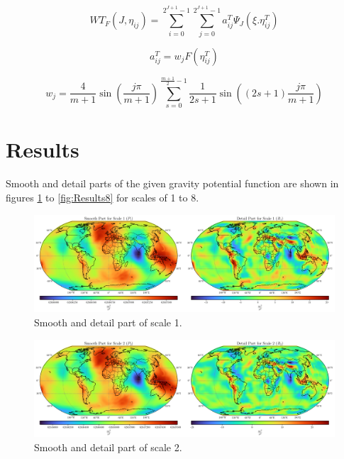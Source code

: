 \documentclass[12pt]{article}
\begin{document}
	\begin{equation}
		WT_F(J,\eta_{ij}) = \displaystyle \sum_{i=0}^{2^{J+1}-1} \sum_{j=0}^{2^{J+1}-1} a_{ij}^T \Psi_J(\xi.\eta_{ij}^T)
	\end{equation}
	
	\begin{equation}
		a_{ij}^T = w_jF(\eta_{ij}^T)
	\end{equation}
	
	\begin{equation}
		w_j = \frac{4}{m+1} \sin\left(\frac{j\pi}{m+1}\right) \displaystyle \sum_{s=0}^{\frac{m+1}{2}-1} \frac{1}{2s+1} \sin\left((2s+1)\frac{j\pi}{m+1}\right)
	\end{equation}
	\clearpage
	
	\section{Results}
	
	Smooth and detail parts of the given gravity potential function are shown in figures \ref{fig:Results1} to \ref{fig:Results8} for scales of 1 to 8.
	\begin{figure}[h!]
		\centering
		\includegraphics[width=16cm]{../Outputs/Plots/Outputs_Scale1.pdf}
		\caption{Smooth and detail part of scale 1.}
		\label{fig:Results1}
	\end{figure}
	
	\begin{figure}[h!]
		\centering
		\includegraphics[width=16cm]{../Outputs/Plots/Outputs_Scale2.pdf}
		\caption{Smooth and detail part of scale 2.}
		\label{fig:Results2}
	\end{figure}
	
\end{document}

